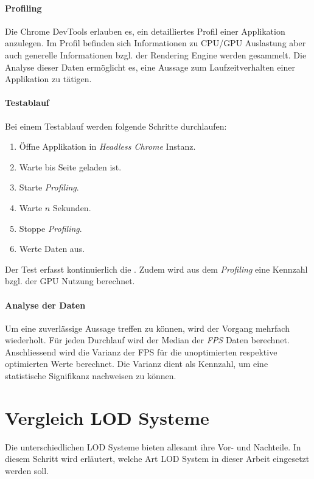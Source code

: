 \paragraph{Profiling}
Die Chrome DevTools erlauben es, ein detailliertes Profil einer Applikation anzulegen.
Im Profil befinden sich Informationen zu CPU/GPU Auslastung aber auch generelle Informationen bzgl. der Rendering Engine werden gesammelt.
Die Analyse dieser Daten ermöglicht es, eine Aussage zum Laufzeitverhalten einer Applikation zu tätigen.

\paragraph{Testablauf}
Bei einem Testablauf werden folgende Schritte durchlaufen:

\begin{enumerate}
  \item Öffne Applikation in \emph{Headless Chrome} Instanz.
  \item Warte bis Seite geladen ist.
  \item Starte \emph{Profiling}.
  \item Warte $n$ Sekunden.
  \item Stoppe \emph{Profiling}.
  \item Werte Daten aus.
\end{enumerate}

Der Test erfasst kontinuierlich die . Zudem wird aus dem \emph{Profiling} eine Kennzahl bzgl. der GPU Nutzung berechnet.

\paragraph{Analyse der Daten}
Um eine zuverlässige Aussage treffen zu können, wird der Vorgang mehrfach wiederholt. Für jeden Durchlauf wird der Median der \emph{FPS} Daten berechnet.
Anschliessend wird die Varianz der FPS für die unoptimierten respektive optimierten Werte berechnet. Die Varianz dient als Kennzahl, um eine statistische Signifikanz nachweisen zu können.

\section{Vergleich LOD Systeme}
Die unterschiedlichen LOD Systeme bieten allesamt ihre Vor- und Nachteile. In diesem Schritt wird erläutert, welche Art LOD System in dieser Arbeit eingesetzt werden soll.

